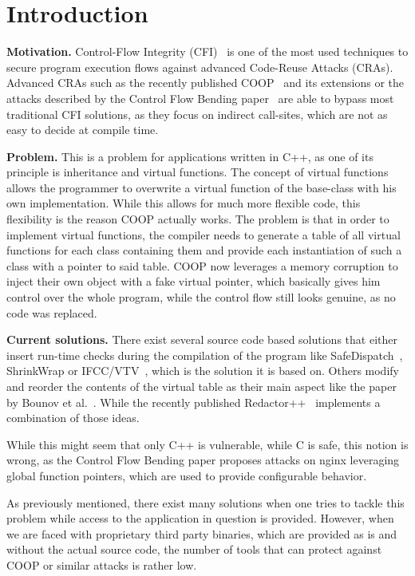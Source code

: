 \section{Introduction}
\label{chapter:Introduction}

\textbf{Motivation.}
\label{Motivation}
Control-Flow Integrity (CFI)~\cite{abadi:cfi2, abadi:cfi} is one of the most used techniques to secure program execution 
flows against advanced Code-Reuse Attacks (CRAs). Advanced CRAs such as the recently published COOP~\cite{schuster:coop} 
and its extensions \cite{crane:readactor++} or the attacks described by the Control Flow Bending paper~\cite{carlini:bending}
are able to bypass most traditional CFI solutions, as they focus on indirect call-sites, which are not as easy to decide at compile time.

\textbf{Problem.} This is a problem for applications written in C++, as one of its principle is inheritance and virtual functions. 
The concept of virtual functions allows the programmer to overwrite a virtual function of the base-class with his
own implementation. While this allows for much more flexible code, this flexibility is the reason COOP actually 
works. The problem is that in order to implement virtual functions, the compiler needs to generate a table of all
virtual functions for each class containing them and provide each instantiation of such a class with a pointer
to said table. COOP now leverages a memory corruption to inject their own object with a fake virtual pointer, 
which basically gives him control over the whole program, while the control flow still looks genuine, as no 
code was replaced. 

\textbf{Current solutions.} There exist several source code based solutions that either insert run-time checks during the compilation of 
the program like SafeDispatch~\cite{safedispatch:jang}, ShrinkWrap \cite{haller:shrinkwrap} or IFCC/VTV~\cite{vtv:tice}, 
which is the solution it is based on. Others modify and reorder the contents of the virtual table as their main 
aspect like the paper by Bounov et al.~\cite{bounov:interleaving}. While the recently published Redactor++~\cite{crane:readactor++}
implements a combination of those ideas.

While this might seem that only C++ is vulnerable, while C is safe, this notion is wrong, as the 
Control Flow Bending paper \cite{carlini:bending} proposes attacks on nginx leveraging global 
function pointers, which are used to provide configurable behavior.

As previously mentioned, there exist many solutions when one tries to tackle this problem while access
to the application in question is provided. However, when we are faced with proprietary third party 
binaries, which are provided as is and without the actual source code, the number of tools that can
protect against COOP or similar attacks is rather low.

